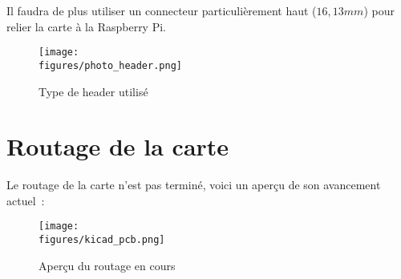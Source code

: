 Il faudra de plus utiliser un connecteur particulièrement haut ($16,13mm$) pour relier la carte à la Raspberry Pi.

\begin{figure}[H]
    \centering
    \texttt{[image: \\figures/photo\_header.png]}
    \decoRule
    \caption[
    Type de header utilisé]{
    Type de header utilisé}
    \label{fig:Type de header utilisé}
    \end{figure}

\section{Routage de la carte}

Le routage de la carte n'est pas terminé, voici un aperçu de son avancement actuel~:

\begin{figure}[H]
    \centering
    \texttt{[image: \\figures/kicad\_pcb.png]}
    \decoRule
    \caption[
    Aperçu du routage en cours]{
    Aperçu du routage en cours}
    \label{fig:Aperçu du routage en cours}
    \end{figure}


